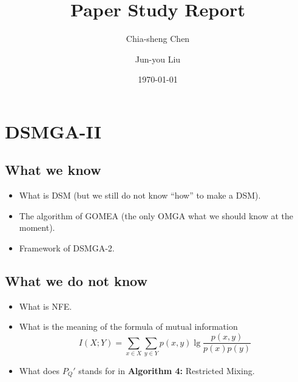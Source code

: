 \documentclass{article}
\title{Paper Study Report}
\author{Chia-sheng Chen \and Jun-you Liu}
\date{\today}
\begin{document}
\maketitle

\section{DSMGA-II}
\subsection{What we know}
\begin{itemize}
  \item What is DSM (but we still do not know ``how'' to make a DSM).
  \item The algorithm of GOMEA (the only OMGA what we should know at the moment).
  \item Framework of DSMGA-2.
\end{itemize}
\subsection{What we do not know}
\begin{itemize}
  \item What is NFE.
  \item What is the meaning of the formula of mutual information $$ I(X;Y) = \sum\limits_{x \in X}\sum\limits_{y \in Y}p(x,y)\lg \frac{p(x,y)}{p(x)p(y)} $$
  \item What does $P_{Q}'$ stands for in \textbf{Algorithm 4:} Restricted Mixing.
\end{itemize}
\end{document}
